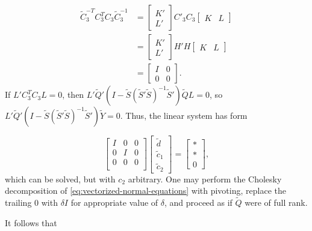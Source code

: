 \documentclass[12pt]{article}
\newcommand{\tildeS}{\tilde{S}}
\newcommand{\tildeY}{\tilde{Y}}
\newcommand{\tildeQ}{\tilde{Q}}
\theoremstyle{definition}
\begin{document}
\begin{align*}
\tilde{C}_3^{-T} C_3^{T} C_3 \tilde{C}_3^{-1} &= \begin{bmatrix} K' \\ L' \end{bmatrix} C'_3C_3 \begin{bmatrix} K &  L\end{bmatrix} \\
&= \begin{bmatrix} K' \\ L' \end{bmatrix} H'H \begin{bmatrix} K &  L\end{bmatrix} \\
&= \begin{bmatrix} I & 0 \\ 0 & 0 \end{bmatrix}.
\end{align*}
\noindent
If $L'C_3^{T} C_3 L = 0$, then $L'\tildeQ'\left( I - \tildeS\left( \tildeS' \tildeS \right)^{-1} \tildeS' \right)\tildeQ L = 0$, so $L'\tildeQ'\left( I - \tildeS\left( \tildeS' \tildeS \right)^{-1} \tildeS' \right) \tildeY = 0$. Thus, the linear system has form

\begin{equation} \label{eq:vectorized-normal-equations-cholesky-2}
\begin{bmatrix}
I & 0 & 0\\
0 & I & 0 \\
0 & 0 & 0 \\
\end{bmatrix}
\begin{bmatrix}
\tilde{d}\\
\tilde{c}_1\\
\tilde{c}_2
\end{bmatrix}
= \begin{bmatrix}
* \\
* \\
0
\end{bmatrix},
\end{equation}
\noindent
which can be solved, but with $c_2$ arbitrary. One may perform the Cholesky decomposition of \ref{eq:vectorized-normal-equations} with pivoting, replace the trailing $0$ with $\delta I$ for appropriate value of $\delta$, and proceed as if $\tildeQ$ were of full rank. 
\bigskip

It follows that
\end{document}
